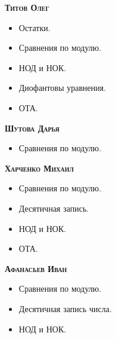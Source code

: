 \documentclass[11pt]{article}
\begin{document}
    \textbf{\textsc{Титов Олег}}
    \begin{itemize}
        \item Остатки.
        \item Сравнения по модулю.
        \item НОД и НОК.
        \item Диофантовы уравнения.
        \item ОТА.
    \end{itemize}
    \textbf{\textsc{Шутова Дарья}}
    \begin{itemize}
        \item Сравнения по модулю.
    \end{itemize}
    \textbf{\textsc{Харченко Михаил}}
    \begin{itemize}
        \item Сравнения по модулю.
        \item Десятичная запись.
        \item НОД и НОК.
        \item ОТА.
    \end{itemize}
    \textbf{\textsc{Афанасьев Иван}}
    \begin{itemize}
        \item Сравнения по модулю.
        \item Десятичная запись числа.
        \item НОД и НОК.
    \end{itemize}
\end{document}
